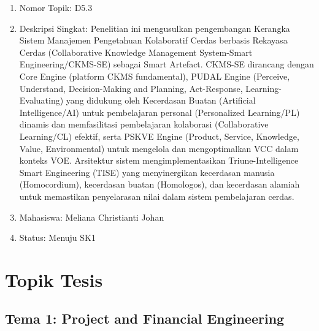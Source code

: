 \documentclass[
  letterpaper,
  DIV=11,
  numbers=noendperiod]{scrreprt}
\providecommand{\tightlist}{%
  \setlength{\itemsep}{0pt}\setlength{\parskip}{0pt}}
\begin{document}
\begin{enumerate}
  \begin{enumerate}
  \def\labelenumii{\arabic{enumii}.}
  \tightlist
  \item
    Nomor Topik: D5.3
  \item
    Deskripsi Singkat: Penelitian ini mengusulkan pengembangan Kerangka
    Sistem Manajemen Pengetahuan Kolaboratif Cerdas berbasis Rekayasa
    Cerdas (Collaborative Knowledge Management System-Smart
    Engineering/CKMS-SE) sebagai Smart Artefact. CKMS-SE dirancang
    dengan Core Engine (platform CKMS fundamental), PUDAL Engine
    (Perceive, Understand, Decision-Making and Planning, Act-Response,
    Learning-Evaluating) yang didukung oleh Kecerdasan Buatan
    (Artificial Intelligence/AI) untuk pembelajaran personal
    (Personalized Learning/PL) dinamis dan memfasilitasi pembelajaran
    kolaborasi (Collaborative Learning/CL) efektif, serta PSKVE Engine
    (Product, Service, Knowledge, Value, Environmental) untuk mengelola
    dan mengoptimalkan VCC dalam konteks VOE. Arsitektur sistem
    mengimplementasikan Triune-Intelligence Smart Engineering (TISE)
    yang menyinergikan kecerdasan manusia (Homocordium), kecerdasan
    buatan (Homologos), dan kecerdasan alamiah untuk memastikan
    penyelarasan nilai dalam sistem pembelajaran cerdas.
  \item
    Mahasiswa: Meliana Christianti Johan
  \item
    Status: Menuju SK1
  \end{enumerate}
\end{enumerate}


\chapter{Topik Tesis}\label{topik-tesis}

\section{Tema 1: Project and Financial
Engineering}\label{tema-1-project-and-financial-engineering-1}
\end{document}
